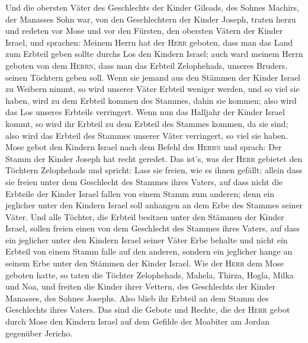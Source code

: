  Und die obersten Väter des Geschlechts der Kinder
Gileads, des Sohnes Machirs, der Manasses Sohn war, von den
Geschlechtern der Kinder Joseph, traten herzu und redeten vor Mose und
vor den Fürsten, den obersten Vätern der Kinder Israel, 
und sprachen: Meinem Herrn hat der \textsc{Herr} geboten, dass man das
Land zum Erbteil geben sollte durchs Los den Kindern Israel; auch ward
meinem Herrn geboten von dem \textsc{Herrn}, dass man das Erbteil
Zelophehads, unseres Bruders, seinen Töchtern geben soll. 
Wenn sie jemand aus den Stämmen der Kinder Israel zu Weibern nimmt, so
wird unserer Väter Erbteil weniger werden, und so viel sie haben, wird
zu dem Erbteil kommen des Stammes, dahin sie kommen; also wird das Los
unseres Erbteils verringert.  Wenn nun das Halljahr der
Kinder Israel kommt, so wird ihr Erbteil zu dem Erbteil des Stammes
kommen, da sie sind; also wird das Erbteil des Stammes unserer Väter
verringert, so viel sie haben.  Mose gebot den Kindern
Israel nach dem Befehl des \textsc{Herrn} und sprach: Der Stamm der
Kinder Joseph hat recht geredet.  Das ist's, was der
\textsc{Herr} gebietet den Töchtern Zelophehads und spricht: Lass sie
freien, wie es ihnen gefällt; allein dass sie freien unter dem
Geschlecht des Stammes ihres Vaters,  auf dass nicht die
Erbteile der Kinder Israel fallen von einem Stamm zum anderen; denn ein
jeglicher unter den Kindern Israel soll anhangen an dem Erbe des Stammes
seiner Väter.  Und alle Töchter, die Erbteil besitzen
unter den Stämmen der Kinder Israel, sollen freien einen von dem
Geschlecht des Stammes ihres Vaters, auf dass ein jeglicher unter den
Kindern Israel seiner Väter Erbe behalte  und nicht ein
Erbteil von einem Stamm falle auf den anderen, sondern ein jeglicher
hange an seinem Erbe unter den Stämmen der Kinder Israel.
 Wie der \textsc{Herr} dem Mose geboten hatte, so taten
die Töchter Zelophehads,  Mahela, Thirza, Hogla, Milka
und Noa, und freiten die Kinder ihrer Vettern,  des
Geschlechts der Kinder Manasses, des Sohnes Josephs. Also blieb ihr
Erbteil an dem Stamm des Geschlechts ihres Vaters.  Das
sind die Gebote und Rechte, die der \textsc{Herr} gebot durch Mose den
Kindern Israel auf dem Gefilde der Moabiter am Jordan gegenüber Jericho.
